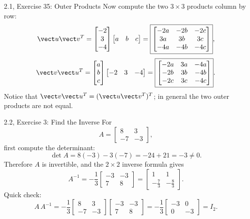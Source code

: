 \begin{frame}{2.1, Exercise 35: Outer Products}
Now compute the two $3\times3$ products column by row:
\[
\vect u\vect v^T
=\begin{bmatrix}-2\\3\\-4\end{bmatrix}
\begin{bmatrix}a&b&c\end{bmatrix}
=\boxed{\begin{bmatrix}
-2a&-2b&-2c\\3a&3b&3c\\-4a&-4b&-4c
\end{bmatrix}},
\]
\pause
\[
\vect v\vect u^T
=\begin{bmatrix}a\\b\\c\end{bmatrix}
\begin{bmatrix}-2&3&-4\end{bmatrix}
=\boxed{\begin{bmatrix}
-2a&3a&-4a\\-2b&3b&-4b\\-2c&3c&-4c
\end{bmatrix}}.
\]
Notice that $\vect v\vect u^T=(\vect u\vect v^T)^T$; in general the two outer products are not equal.
\end{frame}

\begin{frame}{2.2, Exercise 3: Find the Inverse}
For
\[
A=\begin{bmatrix}8&3\\-7&-3\end{bmatrix},
\]
first compute the determinant:
\[
\det A=8(-3)-3(-7)=-24+21=-3\ne0.
\]
Therefore $A$ is invertible, and the $2\times2$ inverse formula gives
\[
A^{-1}
=-\frac{1}{3}\begin{bmatrix}-3&-3\\7&8\end{bmatrix}
=\boxed{\begin{bmatrix}1&1\\-\frac73&-\frac83\end{bmatrix}}.
\]
\pause
Quick check:
\[
A\,A^{-1}
=-\frac13\begin{bmatrix}8&3\\-7&-3\end{bmatrix}
\begin{bmatrix}-3&-3\\7&8\end{bmatrix}
=-\frac13\begin{bmatrix}-3&0\\0&-3\end{bmatrix}=I_2.
\]
\end{frame}

